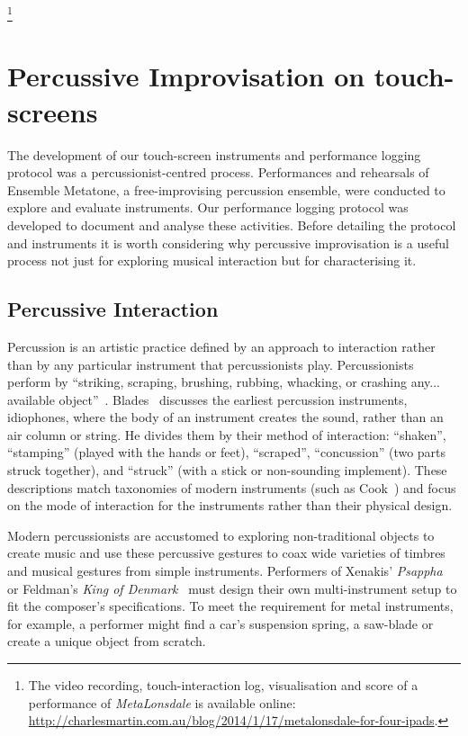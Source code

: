 \documentclass[graybox]{svmult}
\begin{document}
\footnote{\label{note1}The video recording, touch-interaction log,
  visualisation and score of a performance of \emph{MetaLonsdale} is
  available online:
  \url{http://charlesmartin.com.au/blog/2014/1/17/metalonsdale-for-four-ipads}.}

\section{Percussive Improvisation on touch-screens}


The development of our touch-screen instruments and performance
logging protocol was a percussionist-centred process. Performances and
rehearsals of Ensemble Metatone, a free-improvising percussion
ensemble, were conducted to explore and evaluate instruments. Our
performance logging protocol was developed to document and analyse
these activities. Before detailing the protocol and instruments it is
worth considering why percussive improvisation is a useful process not
just for exploring musical interaction but for characterising it.

\subsection{Percussive Interaction}

Percussion is an artistic practice defined by an approach to
interaction rather than by any particular instrument that
percussionists play. Percussionists perform by ``striking, scraping,
brushing, rubbing, whacking, or crashing any... available
object''~\cite{Schick:2006fk}. Blades~\cite{Blades:1992kx} discusses
the earliest percussion instruments, idiophones, where the body of an
instrument creates the sound, rather than an air column or string. He
divides them by their method of interaction: ``shaken'', ``stamping''
(played with the hands or feet), ``scraped'', ``concussion'' (two
parts struck together), and ``struck'' (with a stick or non-sounding
implement). These descriptions match taxonomies of modern instruments
(such as Cook~\cite{Cook:1997vn}) and focus on the mode of interaction
for the instruments rather than their physical design.

Modern percussionists are accustomed to exploring non-traditional
objects to create music and use these percussive gestures to coax wide
varieties of timbres and musical gestures from simple instruments.
Performers of Xenakis' \emph{Psappha}~\cite{Xenakis:1975uq} or
Feldman's \emph{King of Denmark}~\cite{Feldman:1965uq} must design
their own multi-instrument setup to fit the composer's specifications.
To meet the requirement for metal instruments, for example, a
performer might find a car's suspension spring, a saw-blade or create
a unique object from scratch.
\end{document}
